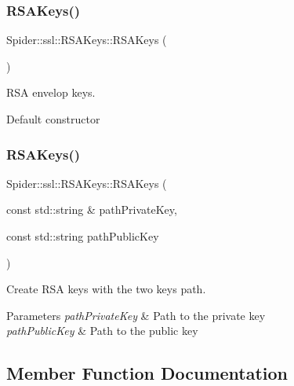 \subsubsection{\texorpdfstring{R\+S\+A\+Keys()}{RSAKeys()}\hspace{0.1cm}{\footnotesize\ttfamily [1/2]}}
{\footnotesize\ttfamily Spider\+::ssl\+::\+R\+S\+A\+Keys\+::\+R\+S\+A\+Keys (\begin{DoxyParamCaption}{ }\end{DoxyParamCaption})\hspace{0.3cm}{\ttfamily [inline]}}



R\+SA envelop keys. 

Default constructor \mbox{\label{class_spider_1_1ssl_1_1_r_s_a_keys_a6dbecb26eadd6691d93a5f8d74ddce70}} 
\subsubsection{\texorpdfstring{R\+S\+A\+Keys()}{RSAKeys()}\hspace{0.1cm}{\footnotesize\ttfamily [2/2]}}
{\footnotesize\ttfamily Spider\+::ssl\+::\+R\+S\+A\+Keys\+::\+R\+S\+A\+Keys (\begin{DoxyParamCaption}\item[{const std\+::string \&}]{path\+Private\+Key,  }\item[{const std\+::string}]{path\+Public\+Key }\end{DoxyParamCaption})}



Create R\+SA keys with the two keys path. 


\begin{DoxyParams}{Parameters}
{\em path\+Private\+Key} & Path to the private key \\
\hline
{\em path\+Public\+Key} & Path to the public key \\
\hline
\end{DoxyParams}


\subsection{Member Function Documentation}
\mbox{\label{class_spider_1_1ssl_1_1_r_s_a_keys_a732ddcc62a20324b3ba10a765276220d}} 
